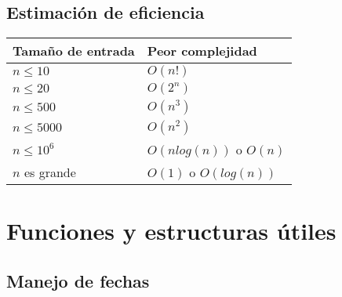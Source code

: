 \documentclass[10pt]{article}
\begin{document}
\subsection{Estimación de eficiencia}

\begin{center}
    \begin{tabular}{ | l | l | }
        \hline
        Tamaño de entrada & Peor complejidad \\
        \hline
        $n \leq 10$ & $O(n!)$ \\
        $n \leq 20$ & $O(2^n)$ \\
        $n \leq 500$ & $O(n^3)$ \\
        $n \leq 5000$ & $O(n^2)$ \\
        $n \leq 10^6$ & $O(n log(n))$ o $O(n)$ \\
        $n$ es grande & $O(1)$ o $O(log(n))$ \\
        \hline
    \end{tabular}
\end{center}

\section{Funciones y estructuras útiles}

\subsection{Manejo de fechas}
\end{document}
